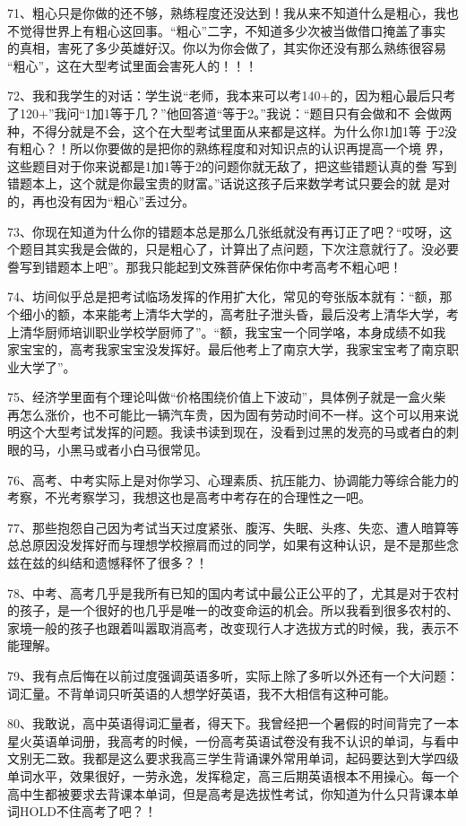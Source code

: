 \documentclass[11pt]{ctexart}
\begin{document}
{{{{71、粗心只是你做的还不够，熟练程度还没达到！我从来不知道什么是粗心，我也
不觉得世界上有粗心这回事。“粗心”二字，不知道多少次被当做借口掩盖了事实
的真相，害死了多少英雄好汉。你以为你会做了，其实你还没有那么熟练很容易
“粗心”，这在大型考试里面会害死人的！！！


72、我和我学生的对话：学生说“老师，我本来可以考140+的，因为粗心最后只考
了120+”我问“1加1等于几？”他回答道“等于2。”我说：“题目只有会做和不
会做两种，不得分就是不会，这个在大型考试里面从来都是这样。为什么你1加1等
于2没有粗心？！所以你要做的是把你的熟练程度和对知识点的认识再提高一个境
界，这些题目对于你来说都是1加1等于2的问题你就无敌了，把这些错题认真的誊
写到错题本上，这个就是你最宝贵的财富。”话说这孩子后来数学考试只要会的就
是对的，再也没有因为“粗心”丢过分。


73、你现在知道为什么你的错题本总是那么几张纸就没有再订正了吧？“哎呀，这
个题目其实我是会做的，只是粗心了，计算出了点问题，下次注意就行了。没必要
誊写到错题本上吧”。那我只能起到文殊菩萨保佑你中考高考不粗心吧！


74、坊间似乎总是把考试临场发挥的作用扩大化，常见的夸张版本就有：“额，那
个细小的额，本来能考上清华大学的，高考肚子泄头昏，最后没考上清华大学，考
上清华厨师培训职业学校学厨师了”。“额，我宝宝一个同学咯，本身成绩不如我
家宝宝的，高考我家宝宝没发挥好。最后他考上了南京大学，我家宝宝考了南京职
业大学了”。


75、经济学里面有个理论叫做“价格围绕价值上下波动”，具体例子就是一盒火柴
再怎么涨价，也不可能比一辆汽车贵，因为固有劳动时间不一样。这个可以用来说
明这个大型考试发挥的问题。我读书读到现在，没看到过黑的发亮的马或者白的刺
眼的马，小黑马或者小白马很常见。


76、高考、中考实际上是对你学习、心理素质、抗压能力、协调能力等综合能力的
考察，不光考察学习，我想这也是高考中考存在的合理性之一吧。


77、那些抱怨自己因为考试当天过度紧张、腹泻、失眠、头疼、失恋、遭人暗算等
总总原因没发挥好而与理想学校擦肩而过的同学，如果有这种认识，是不是那些念
兹在兹的纠结和遗憾释怀了很多？！


78、中考、高考几乎是我所有已知的国内考试中最公正公平的了，尤其是对于农村
的孩子，是一个很好的也几乎是唯一的改变命运的机会。所以我看到很多农村的、
家境一般的孩子也跟着叫嚣取消高考，改变现行人才选拔方式的时候，我，表示不
能理解。


79、我有点后悔在以前过度强调英语多听，实际上除了多听以外还有一个大问题：
词汇量。不背单词只听英语的人想学好英语，我不大相信有这种可能。


80、我敢说，高中英语得词汇量者，得天下。我曾经把一个暑假的时间背完了一本
星火英语单词册，我高考的时候，一份高考英语试卷没有我不认识的单词，与看中
文别无二致。我都是这么要求我高三学生背诵课外常用单词，起码要达到大学四级
单词水平，效果很好，一劳永逸，发挥稳定，高三后期英语根本不用操心。每一个
高中生都被要求去背课本单词，但是高考是选拔性考试，你知道为什么只背课本单
词HOLD不住高考了吧？！


}}}}
\end{document}
